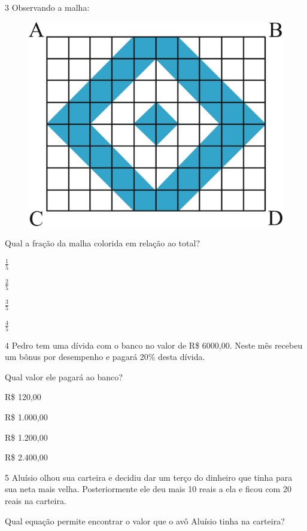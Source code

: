 \pagebreak
\num{3} Observando a malha:

\begin{figure}[htpb!]
\centering
\includegraphics[width=.4\textwidth]{./ilustras-mat/Simulado_1-atividade_3.png}
\end{figure}

Qual a fração da malha colorida em relação ao total?

\begin{escolha}

  \item $\frac{1}{5}$

  \item $\frac{2}{5}$

  \item $\frac{3}{5}$

  \item $\frac{4}{5}$

\end{escolha}

\num{4} Pedro tem uma dívida com o banco no valor de R\$ 6000,00. Neste mês
recebeu um bônus por desempenho e pagará 20\% desta dívida.

Qual valor ele pagará ao banco?

\begin{escolha}

  \item R\$ 120,00

  \item R\$ 1.000,00

  \item R\$ 1.200,00

  \item R\$ 2.400,00

\end{escolha}


\num{5} Aluísio olhou sua carteira e decidiu dar um terço do dinheiro 
que tinha para sua neta mais velha. Posteriormente ele deu mais 10 reais 
a ela e ficou com 20 reais na carteira.

Qual equação permite encontrar o valor que o avô Aluísio tinha na 
carteira?

